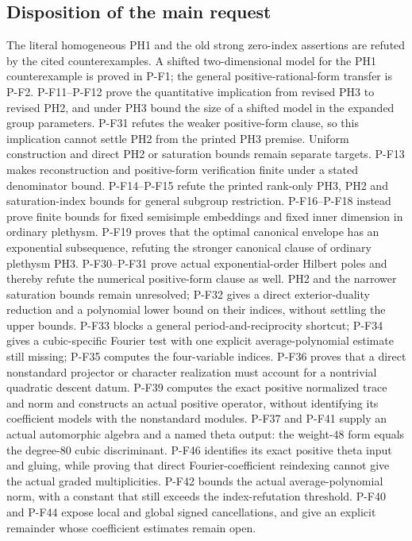 \documentclass[11pt,a4paper]{article}
\begin{document}
\subsection{Disposition of the main request}
The literal homogeneous PH1 and the old strong zero-index assertions
are refuted by the cited counterexamples. A shifted two-dimensional
model for the PH1 counterexample is proved in P-F1; the general
positive-rational-form transfer is P-F2. P-F11--P-F12 prove the
quantitative implication from revised PH3 to revised PH2, and under
PH3 bound the size of a shifted model in the expanded group parameters.
P-F31 refutes the weaker positive-form clause, so this implication
cannot settle PH2 from the printed PH3 premise. Uniform construction
and direct PH2 or saturation bounds remain separate targets. P-F13 makes reconstruction and positive-form verification
finite under a stated denominator bound. P-F14--P-F15 refute the
printed rank-only PH3, PH2 and saturation-index bounds for general
subgroup restriction. P-F16--P-F18 instead prove finite bounds for
fixed semisimple embeddings and fixed inner dimension in ordinary
plethysm. P-F19 proves that the optimal canonical envelope has an
exponential subsequence, refuting the stronger canonical clause of
ordinary plethysm PH3. P-F30--P-F31 prove actual exponential-order
Hilbert poles and thereby refute the numerical positive-form clause
as well. PH2 and the narrower saturation bounds remain unresolved;
P-F32 gives a direct exterior-duality reduction and a polynomial
lower bound on their indices, without settling the upper bounds.
P-F33 blocks a general period-and-reciprocity shortcut; P-F34 gives
a cubic-specific Fourier test with one explicit average-polynomial
estimate still missing; P-F35 computes the four-variable indices.
P-F36 proves that a direct nonstandard projector or character
realization must account for a nontrivial quadratic descent datum.
P-F39 computes the exact positive normalized trace and norm and
constructs an actual positive operator, without identifying its
coefficient models with the nonstandard modules. P-F37 and P-F41
supply an actual automorphic algebra and a named theta output:
the weight-$48$ form equals the degree-$80$ cubic discriminant.
P-F46 identifies its exact positive theta input and gluing,
while proving that direct Fourier-coefficient reindexing
cannot give the actual graded multiplicities.
P-F42 bounds the actual average-polynomial norm, with a constant
that still exceeds the index-refutation threshold. P-F40 and
P-F44 expose local and global signed cancellations, and give
an explicit remainder whose coefficient estimates remain open.
\end{document}

